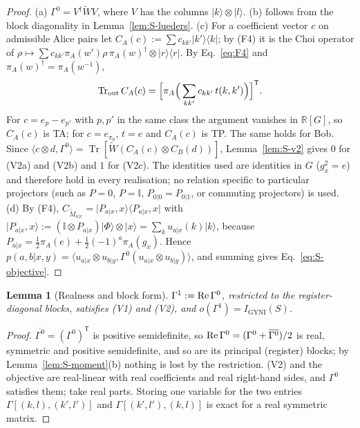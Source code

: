 \documentclass[aps,pra,onecolumn,notitlepage,superscriptaddress,longbibliography,nofootinbib,11pt]{revtex4-2}
\newtheorem{lemma}{Lemma}
\theoremstyle{remark}
\newcommand{\Tr}{\operatorname{Tr}}
\newcommand{\ket}[1]{\lvert #1\rangle}
\newcommand{\bra}[1]{\langle #1\rvert}
\newcommand{\one}{\mathbb{I}}
\newcommand{\tp}{\mathsf{T}}
\newcommand{\RR}{\mathbb{R}}
\newcommand{\Igy}{I_{\mathrm{GYNI}}}
\begin{document}
\begin{proof}
(a) $\Gamma^0=V^\dagger\widetilde WV$, where $V$ has the columns $\ket{k}\otimes\ket{l}$. (b) follows from the block diagonality in Lemma~\ref{lem:S-lueders}. (c) For a coefficient vector $c$ on admissible Alice pairs let $C_A(c):=\sum c_{kk'}\ket{k'}\bra{k}$; by (F4) it is the Choi operator of $\rho\mapsto\sum c_{kk'}\pi_A(w')\rho\,\pi_A(w)^\dagger\otimes\ket{r}\bra{r}$. By Eq.~\eqref{eq:F4} and $\pi_A(w)^\dagger=\pi_A(w^{-1})$,
\begin{equation}
\Tr_{\rm out}C_A(c)=\Big[\pi_A\Big(\sum_{kk'}c_{kk'}\,t(k,k')\Big)\Big]^\tp .
\end{equation}
For $c=e_p-e_{p'}$ with $p,p'$ in the same class the argument vanishes in $\RR[G]$, so $C_A(c)$ is TA; for $c=e_{\pi_0}$, $t=e$ and $C_A(c)$ is TP. The same holds for Bob. Since $\langle c\otimes d,\Gamma^0\rangle=\Tr[\widetilde W(C_A(c)\otimes C_B(d))]$, Lemma~\ref{lem:S-v2} gives $0$ for (V2a) and (V2b) and $1$ for (V2c). The identities used are identities in $G$ ($g_x^2=e$) and therefore hold in every realisation; no relation specific to particular projectors (such as $P=0$, $P=\one$, $P_{0|0}=P_{0|1}$, or commuting projectors) is used.
(d) By (F4), $C_{\widetilde M_{a|x}}=\ket{P_{a|x},x}\bra{P_{a|x},x}$ with $\ket{P_{a|x},x}:=(\one\otimes P_{a|x})\ket{\Phi}\otimes\ket{x}=\sum_ku_{a|x}(k)\ket{k}$, because $P_{a|x}=\frac12\pi_A(e)+\frac12(-1)^a\pi_A(g_x)$. Hence $p(a,b|x,y)=\langle u_{a|x}\otimes u_{b|y},\Gamma^0(u_{a|x}\otimes u_{b|y})\rangle$, and summing gives Eq.~\eqref{eq:S-objective}.
\end{proof}

\begin{lemma}[Realness and block form]\label{lem:S-real}
$\Gamma^1:={\rm Re}\,\Gamma^0$, restricted to the register-diagonal blocks, satisfies (V1) and (V2), and $o(\Gamma^1)=\Igy(S)$.
\end{lemma}

\begin{proof}
$\overline{\Gamma^0}=(\Gamma^0)^\tp$ is positive semidefinite, so ${\rm Re}\,\Gamma^0=(\Gamma^0+\overline{\Gamma^0})/2$ is real, symmetric and positive semidefinite, and so are its principal (register) blocks; by Lemma~\ref{lem:S-moment}(b) nothing is lost by the restriction. (V2) and the objective are real-linear with real coefficients and real right-hand sides, and $\Gamma^0$ satisfies them; take real parts. Storing one variable for the two entries $\Gamma[(k,l),(k',l')]$ and $\Gamma[(k',l'),(k,l)]$ is exact for a real symmetric matrix.
\end{proof}
\end{document}
